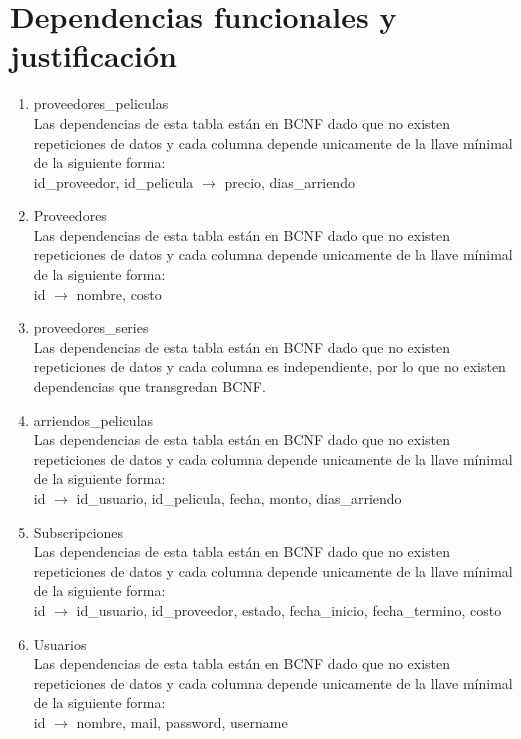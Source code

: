 \documentclass{article}
\begin{document}
\section{Dependencias funcionales y justificación}
\begin{enumerate}
    \item proveedores\_peliculas \\
    Las dependencias de esta tabla están en BCNF dado que no existen repeticiones de datos y cada columna depende unicamente de la llave mínimal de la siguiente forma: \\
    id\_proveedor, id\_pelicula $\rightarrow$ precio, dias\_arriendo
    \item Proveedores \\
    Las dependencias de esta tabla están en BCNF dado que no existen repeticiones de datos y cada columna depende unicamente de la llave mínimal de la siguiente forma: \\
    id $\rightarrow$ nombre, costo
    \item proveedores\_series \\
    Las dependencias de esta tabla están en BCNF dado que no existen repeticiones de datos y cada columna es independiente, por lo que no existen dependencias que transgredan BCNF. \\
    \item arriendos\_peliculas \\
    Las dependencias de esta tabla están en BCNF dado que no existen repeticiones de datos y cada columna depende unicamente de la llave mínimal de la siguiente forma: \\
    id $\rightarrow$ id\_usuario, id\_pelicula, fecha, monto, dias\_arriendo \\
    \item Subscripciones \\
    Las dependencias de esta tabla están en BCNF dado que no existen repeticiones de datos y cada columna depende unicamente de la llave mínimal de la siguiente forma: \\
    id $\rightarrow$ id\_usuario, id\_proveedor, estado, fecha\_inicio, fecha\_termino, costo \\
    \item Usuarios \\
    Las dependencias de esta tabla están en BCNF dado que no existen repeticiones de datos y cada columna depende unicamente de la llave mínimal de la siguiente forma: \\
    id $\rightarrow$ nombre, mail, password, username \\

\end{enumerate}
\end{document}

